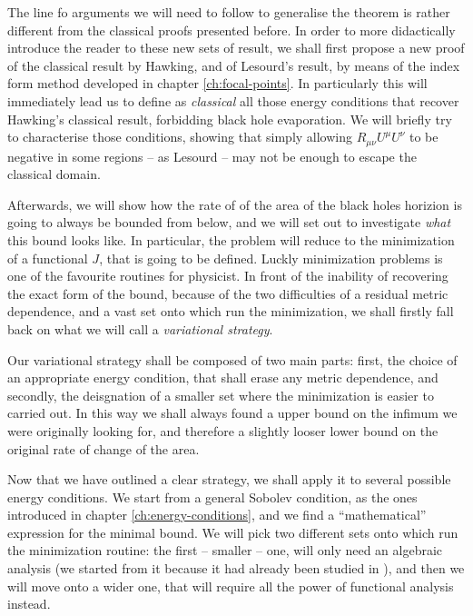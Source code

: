 The line fo arguments we will need to follow to generalise the theorem is rather different from the classical proofs presented before. In order to more didactically introduce the reader to these new sets of result, we shall first propose a new proof of the classical result by Hawking, and of Lesourd's result, by means of the index form method developed in chapter \ref{ch:focal-points}. In particularly this will immediately lead us to define as \emph{classical} all those energy conditions that recover Hawking's classical result, forbidding black hole evaporation. We will briefly try to characterise those conditions, showing that simply allowing \(R_{\mu\nu}U^{\mu}U^{\nu}\) to be negative in some regions -- as Lesourd -- may not be enough to escape the classical domain.

Afterwards, we will show how the rate of of the area of the black holes horizion is going to always be bounded from below, and we will set out to investigate \emph{what} this bound looks like. In particular, the problem will reduce to the minimization of a functional \(J\), that is going to be defined.
Luckly minimization problems is one of the favourite routines for physicist. In front of the inability of recovering the exact form of the bound, because of the two difficulties of a residual metric dependence, and a vast set onto which run the minimization, we shall firstly fall back on what we will call a \emph{variational strategy}.

Our variational strategy shall be composed of two main parts: first, the choice of an appropriate energy condition, that shall erase any metric dependence, and secondly, the deisgnation of a smaller set where the minimization is easier to carried out. In this way we shall always found a upper bound on the infimum we were originally looking for, and therefore a slightly looser lower bound on the original rate of change of the area.

Now that we have outlined a clear strategy, we shall apply it to several possible energy conditions. We start from a general Sobolev condition, as the ones introduced in chapter \ref{ch:energy-conditions}, and we find a ``mathematical'' expression for the minimal bound. We will pick two different sets onto which run the minimization routine: the first -- smaller -- one, will only need an algebraic analysis (we started from it because it had already been studied in \cite[]{fewster2020new}), and then we will move onto a wider one, that will require all the power of functional analysis instead.

